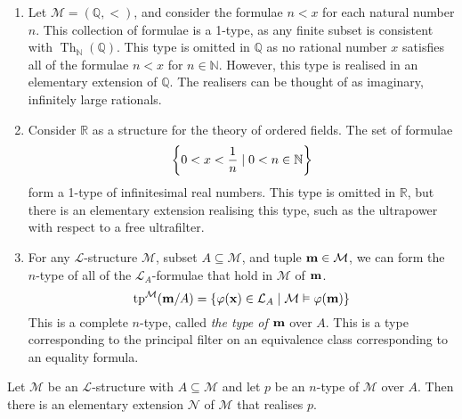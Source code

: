 \begin{example}
    \begin{enumerate}
        \item Let \( \mathcal M = (\mathbb Q, <) \), and consider the formulae \( n < x \) for each natural number \( n \).
        This collection of formulae is a 1-type, as any finite subset is consistent with \( \operatorname{Th}_{\mathbb N}(\mathbb Q) \).
        This type is omitted in \( \mathbb Q \) as no rational number \( x \) satisfies all of the formulae \( n < x \) for \( n \in \mathbb N \).
        However, this type is realised in an elementary extension of \( \mathbb Q \).
        The realisers can be thought of as imaginary, infinitely large rationals.
        \item Consider \( \mathbb R \) as a structure for the theory of ordered fields.
        The set of formulae
        \[ \qty{0 < x < \frac{1}{n} \mid 0 < n \in \mathbb N} \]
        form a 1-type of infinitesimal real numbers.
        This type is omitted in \( \mathbb R \), but there is an elementary extension realising this type, such as the ultrapower with respect to a free ultrafilter.
        \item For any \( \mathcal L \)-structure \( \mathcal M \), subset \( A \subseteq \mathcal M \), and tuple \( \vb m \in \mathcal M \), we can form the \( n \)-type of all of the \( \mathcal L_A \)-formulae that hold in \( \mathcal M \) of \( \vb m \).
        \[ \operatorname{tp}^{\mathcal M}(\vb m/A) = \qty{\varphi(\vb x) \in \mathcal L_A \mid \mathcal M \vDash \varphi(\vb m)} \]
        This is a complete \( n \)-type, called \emph{the type of \( \vb m \)} over \( A \).
        This is a type corresponding to the principal filter on an equivalence class corresponding to an equality formula.
    \end{enumerate}
\end{example}
\begin{proposition}
    Let \( \mathcal M \) be an \( \mathcal L \)-structure with \( A \subseteq \mathcal M \) and let \( p \) be an \( n \)-type of \( \mathcal M \) over \( A \).
    Then there is an elementary extension \( \mathcal N \) of \( \mathcal M \) that realises \( p \).
\end{proposition}
